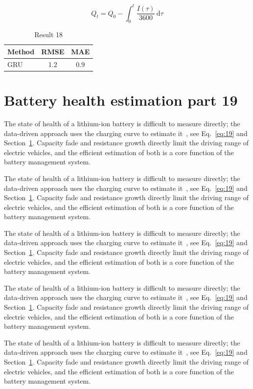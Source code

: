 \documentclass[11pt]{article}
\begin{document}
\begin{equation}\label{eq:18}
  Q_t = Q_0 - \int_0^t \frac{I(\tau)}{3600}\,\mathrm{d}\tau
\end{equation}
\begin{table}[h]\centering\begin{tabular}{lcc}\toprule Method & RMSE & MAE\\\midrule GRU & 1.2 & 0.9\\\bottomrule\end{tabular}\caption{Result 18}\end{table}

\section{Battery health estimation part 19}\label{sec:19}
The state of health of a lithium-ion battery is difficult to measure directly; the data-driven approach uses the charging curve to estimate it~\cite{a2020}, see Eq.~\eqref{eq:19} and Section~\ref{sec:19}. Capacity fade and resistance growth directly limit the driving range of electric vehicles, and the efficient estimation of both is a core function of the battery management system.

The state of health of a lithium-ion battery is difficult to measure directly; the data-driven approach uses the charging curve to estimate it~\cite{a2020}, see Eq.~\eqref{eq:19} and Section~\ref{sec:19}. Capacity fade and resistance growth directly limit the driving range of electric vehicles, and the efficient estimation of both is a core function of the battery management system.

The state of health of a lithium-ion battery is difficult to measure directly; the data-driven approach uses the charging curve to estimate it~\cite{a2020}, see Eq.~\eqref{eq:19} and Section~\ref{sec:19}. Capacity fade and resistance growth directly limit the driving range of electric vehicles, and the efficient estimation of both is a core function of the battery management system.

The state of health of a lithium-ion battery is difficult to measure directly; the data-driven approach uses the charging curve to estimate it~\cite{a2020}, see Eq.~\eqref{eq:19} and Section~\ref{sec:19}. Capacity fade and resistance growth directly limit the driving range of electric vehicles, and the efficient estimation of both is a core function of the battery management system.

The state of health of a lithium-ion battery is difficult to measure directly; the data-driven approach uses the charging curve to estimate it~\cite{a2020}, see Eq.~\eqref{eq:19} and Section~\ref{sec:19}. Capacity fade and resistance growth directly limit the driving range of electric vehicles, and the efficient estimation of both is a core function of the battery management system.
\end{document}
